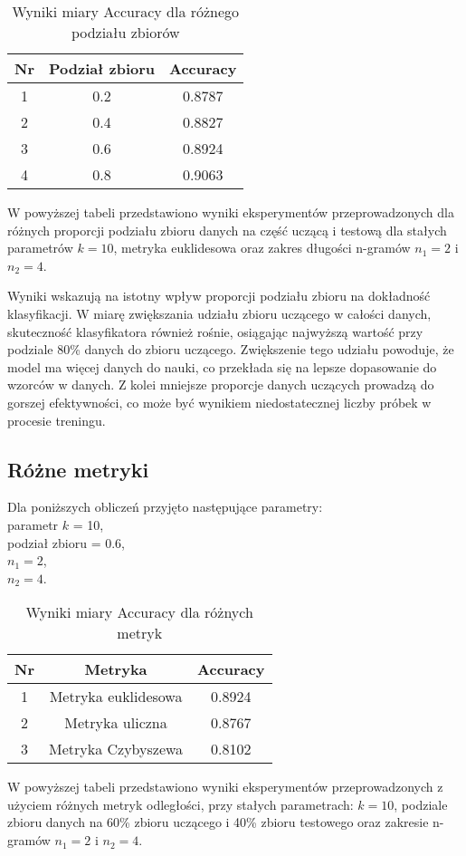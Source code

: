 \documentclass{article}
\begin{document}
\begin{table}[h!]
    \centering
    \begin{tabular}{|c|c|c|}
    \hline
    \textbf{Nr} & \textbf{Podział zbioru} & \textbf{Accuracy} \\ \hline
    1 & 0.2 & 0.8787\\ \hline
    2 & 0.4 & 0.8827 \\ \hline
    3 & 0.6 & 0.8924 \\ \hline
    4 & 0.8 & 0.9063 \\ \hline 
    \end{tabular}
    \caption{Wyniki miary Accuracy dla różnego podziału zbiorów}
\end{table}
W powyższej tabeli przedstawiono wyniki eksperymentów przeprowadzonych dla różnych proporcji podziału zbioru danych na część uczącą i testową dla stałych parametrów \(k = 10\), metryka euklidesowa oraz zakres długości n-gramów \(n_1 = 2\) i \(n_2 = 4\).

Wyniki wskazują na istotny wpływ proporcji podziału zbioru na dokładność klasyfikacji. W miarę zwiększania udziału zbioru uczącego w całości danych, skuteczność klasyfikatora również rośnie, osiągając najwyższą wartość przy podziale 80\% danych do zbioru uczącego. Zwiększenie tego udziału powoduje, że model ma więcej danych do nauki, co przekłada się na lepsze dopasowanie do wzorców w danych. Z kolei mniejsze proporcje danych uczących prowadzą do gorszej efektywności, co może być wynikiem niedostatecznej liczby próbek w procesie treningu.

\subsection{Różne metryki}
Dla poniższych obliczeń przyjęto następujące parametry:\\ parametr \(k\) = 10, \\podział zbioru = 0.6, \\\(n_1 = 2\),\\ \(n_2 = 4\). 

\begin{table}[h!]
    \centering
    \begin{tabular}{|c|c|c|}
    \hline
    \textbf{Nr} & \textbf{Metryka} & \textbf{Accuracy} \\ \hline
    1 & Metryka euklidesowa & 0.8924\\ \hline
    2 & Metryka uliczna & 0.8767 \\ \hline
    3 & Metryka Czybyszewa & 0.8102 \\ \hline
    \end{tabular}
    \caption{Wyniki miary Accuracy dla różnych metryk}
\end{table}
W powyższej tabeli przedstawiono wyniki eksperymentów przeprowadzonych z użyciem różnych metryk odległości, przy stałych parametrach: \(k = 10\), podziale zbioru danych na 60\% zbioru uczącego i 40\% zbioru testowego oraz zakresie n-gramów \(n_1 = 2\) i \(n_2 = 4\).
\end{document}
